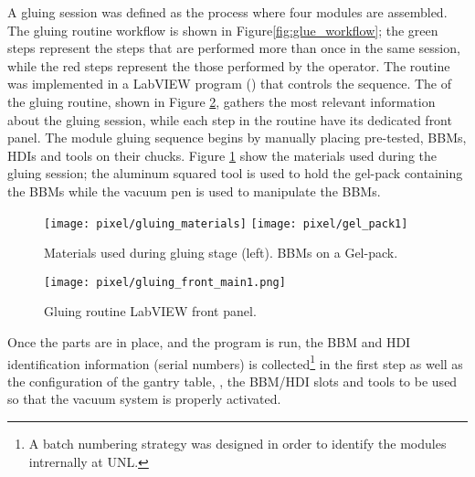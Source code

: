 A gluing session was defined as the process where four modules are assembled. The gluing routine workflow is shown in Figure\ref{fig:glue_workflow}; the green steps represent the steps that are performed more than once in the same session, while the red steps represent the those performed by the operator. The routine was implemented in a LabVIEW program () that controls the sequence. The  of the gluing routine, shown in Figure \ref{fig:gluing_front_main}, gathers the most relevant information about the gluing session, while each step in the routine have its dedicated front panel. The module gluing sequence begins by manually placing pre-tested, BBMs, HDIs and tools on their chucks. Figure \ref{fig:gluing_materials} show the materials used during the gluing session; the aluminum squared tool is used to hold the gel-pack containing the BBMs while the vacuum pen is used to manipulate the BBMs.

\begin{figure}[h]
\begin{center}
  \texttt{[image: pixel/gluing\_materials]}
  \texttt{[image: pixel/gel\_pack1]}
 \caption[Materials used during gluing stage]{Materials used during gluing stage (left). BBMs on a Gel-pack.}\label{fig:gluing_materials}
\end{center}
\end{figure}

\begin{landscape}
\begin{figure}[h]
  \begin{center}
    \vspace{-2.5cm}
    \hspace{-1cm}
    \texttt{[image: pixel/gluing\_front\_main1.png]}
    \caption[Gluing routine LabVIEW front panel]{Gluing routine LabVIEW front panel.}\label{fig:gluing_front_main}
    \vspace{-2cm}
    \hspace{-2cm}
  \end{center}
\end{figure}
\end{landscape}


Once the parts are in place, and the program is run, the BBM and HDI identification information (serial numbers) is collected\footnote{A batch numbering strategy was designed in order to identify the modules intrernally at UNL.} in the first step as well as the configuration of the gantry table, \ie, the BBM/HDI slots and tools to be used so that the vacuum system is properly activated. 

